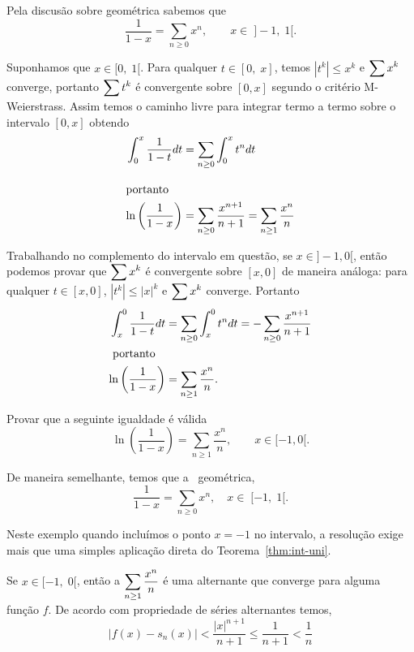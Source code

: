 \solo Pela discusão sobre \ser geométrica sabemos que
\begin{equation*}
\frac{1}{1-x}=\sum_{n\ge 0}x^n,\qquad x \in\; ]-1, \; 1[.
\end{equation*}

Suponhamos que $x\in [0, \; 1[$. Para qualquer $t\in [0, \; x]$, temos
$|t^k|\le x^k$ e $\displaystyle{\sum x^k}$ converge, portanto $\displaystyle{\sum
t^k}$ é \unif convergente sobre $[0,x]$ segundo o critério
M-Weierstrass. Assim temos o caminho livre para integrar termo a
termo sobre o intervalo $[0,x]$ obtendo
\begin{align*}
    \int_0^x\frac{1}{1-t}dt&=\sum_{n\ge 0}\int_0^x t^n dt\\[2ex]
    \intertext{portanto }
\ln \left(\frac{1}{1-x}\right)&=\sum_{n\ge
0}\frac{x^{n+1}}{n+1}=\sum_{n\ge 1}\frac{x^{n}}{n}
\end{align*}

Trabalhando no complemento do intervalo em questão, se $x\in
]-1,0[$, então podemos provar que $\displaystyle{\sum x^k}$ é \unif
convergente sobre $[x,0]$ de maneira análoga: para qualquer $t\in
[x,0]$, $|t^k|\le |x|^k$ e $\displaystyle{\sum x^k}$ converge. Portanto
\begin{align*}
    \int^0_x\frac{1}{1-t}dt&=\sum_{n\ge 0}\int^0_x t^n dt=-\sum_{n\ge
0}\frac{x^{n+1}}{n+1}\\
    \intertext{ portanto }
\ln \left(\frac{1}{1-x}\right)&=\sum_{n\ge 1}\frac{x^{n}}{n}.
\end{align*}

\begin{exer}
Provar que a seguinte igualdade é válida
\begin{equation*}
    \ln \left(\frac{1}{1-x}\right)=\sum_{n\ge 1}\frac{x^n}{n},\qquad x\in
    [-1,0[.
\end{equation*}
\end{exer}

\solo De maneira semelhante, temos que a \ser\ geométrica,
\begin{equation*}
    \frac{1}{1-x}=\sum_{n\ge 0}x^n,\quad x \in\; [-1,\; 1[.
\end{equation*}

Neste exemplo quando incluímos o ponto $x=-1$ no intervalo, a
resolução exige mais que uma simples aplicação direta do
Teorema~\ref{thm:int-uni}.

Se $x\in [-1,\; 0[$, então a \ser $\displaystyle{\sum_{n\ge 1}\frac{x^n}{n}}$
é uma \ser alternante que converge para alguma função $f$. De
acordo com propriedade de séries alternantes temos,
\begin{equation*}
    |f(x)-s_n(x)|<\frac{|x|^{n+1}}{n+1}\le \frac{1}{n+1}<\frac{1}{n}
\end{equation*}

